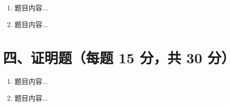 \documentclass[12pt,a4paper]{article}
\begin{document}
\begin{enumerate}
  \item 题目内容...

  \vspace{4cm}

  \item 题目内容...

  \vspace{4cm}
\end{enumerate}

\section*{四、证明题（每题 15 分，共 30 分）}

\begin{enumerate}
  \item 题目内容...

  \vspace{5cm}

  \item 题目内容...

  \vspace{5cm}
\end{enumerate}
\end{document}
